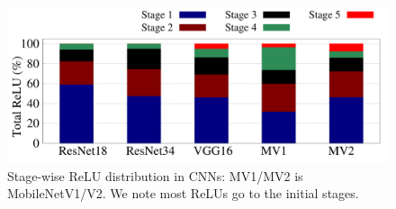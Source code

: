 \begin{figure}[t] \centering
\includegraphics[scale=0.225]{Figures/StageWiseReluPercentage}
\vspace{-2em}
\caption{Stage-wise ReLU distribution in CNNs: MV1/MV2 is MobileNetV1/V2.
We note most ReLUs go to the initial stages.}
\label{fig:StageWiseReluPercentage}
\end{figure}
